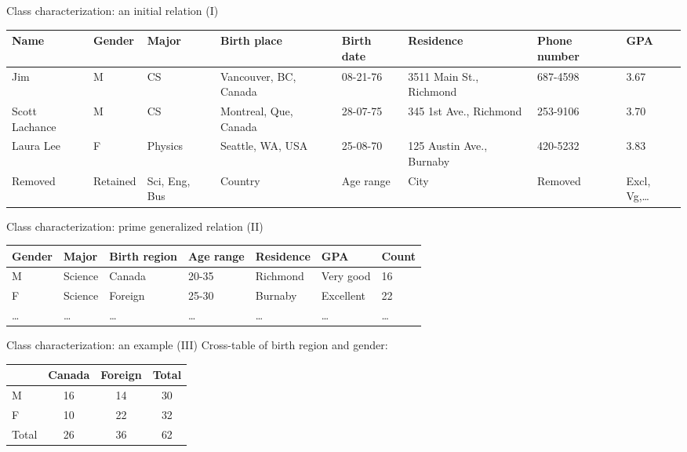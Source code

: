 \documentclass[aspectratio=169,t]{beamer}
\begin{document}
  { 
    \begin{frame}{Class characterization: an initial relation (I)}
    \begin{table}
    \small
    \begin{tabularx}{\textwidth}{|X|X|X|X|X|X|X|X|}
    \hline
    \textbf{Name} & \textbf{Gender} & \textbf{Major} & \textbf{Birth place} & \textbf{Birth date} & \textbf{Residence} & \textbf{Phone number} & \textbf{GPA} \\\hline
    Jim & M & CS & Vancouver, BC, Canada & 08-21-76 & 3511 Main St., Richmond & 687-4598 & 3.67 \\\hline
    Scott Lachance & M & CS & Montreal, Que, Canada & 28-07-75 & 345 1st Ave., Richmond & 253-9106 & 3.70 \\\hline
    Laura Lee & F & Physics & Seattle, WA, USA & 25-08-70 & 125 Austin Ave., Burnaby & 420-5232 & 3.83 \\\hline
    {\color{red}Removed} & {\color{red}Retained} & {\color{red}Sci, Eng, Bus} & {\color{red}Country} & {\color{red}Age range} & {\color{red}City} & {\color{red}Removed} & {\color{red}Excl, Vg,\ldots} \\\hline
    \end{tabularx}
    \end{table}
    \end{frame}
  }

  { 
    \begin{frame}{Class characterization: prime generalized relation (II)}
    \begin{table}
    \begin{tabularx}{\textwidth}{|X|X|X|X|X|X|X|}
    \hline
    \textbf{Gender} & \textbf{Major} & \textbf{Birth region} & \textbf{Age range} & \textbf{Residence} & \textbf{GPA} & \textbf{Count} \\\hline
    M & Science & Canada & 20-35 & Richmond & Very good & 16 \\\hline
    F & Science & Foreign & 25-30 & Burnaby & Excellent & 22 \\\hline
    \ldots & \ldots & \ldots & \ldots & \ldots & \ldots & \ldots \\
    \hline
    \end{tabularx}
    \end{table}
    \end{frame}
  }

  { 
    \begin{frame}{Class characterization: an example (III)}
    \centering
    Cross-table of birth region and gender:\\[0.5cm]
    \begin{tabular}{|l|c|c|c|}
    \hline
    & Canada & Foreign & Total \\\hline
    M & 16 & 14 & 30 \\\hline
    F & 10 & 22 & 32 \\\hline
    Total & 26 & 36 & 62 \\\hline
    \end{tabular}
    \end{frame}
  }
\end{document}
